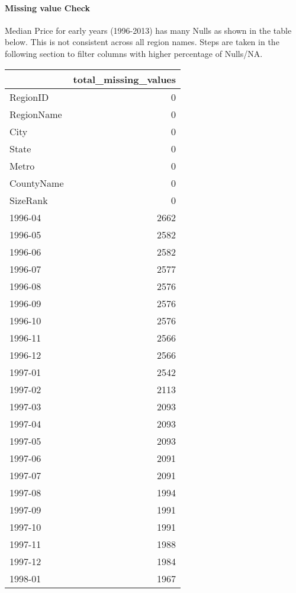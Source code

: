 \documentclass[
]{article}
\begin{document}
\hypertarget{missing-value-check}{%
\paragraph{Missing value Check}\label{missing-value-check}}

Median Price for early years (1996-2013) has many Nulls as shown in the
table below. This is not consistent across all region names. Steps are
taken in the following section to filter columns with higher percentage
of Nulls/NA.

\begin{table}[H]
\centering
\begin{tabular}{l|r}
\hline
  & total\_missing\_values\\
\hline
RegionID & 0\\
\hline
RegionName & 0\\
\hline
City & 0\\
\hline
State & 0\\
\hline
Metro & 0\\
\hline
CountyName & 0\\
\hline
SizeRank & 0\\
\hline
1996-04 & 2662\\
\hline
1996-05 & 2582\\
\hline
1996-06 & 2582\\
\hline
1996-07 & 2577\\
\hline
1996-08 & 2576\\
\hline
1996-09 & 2576\\
\hline
1996-10 & 2576\\
\hline
1996-11 & 2566\\
\hline
1996-12 & 2566\\
\hline
1997-01 & 2542\\
\hline
1997-02 & 2113\\
\hline
1997-03 & 2093\\
\hline
1997-04 & 2093\\
\hline
1997-05 & 2093\\
\hline
1997-06 & 2091\\
\hline
1997-07 & 2091\\
\hline
1997-08 & 1994\\
\hline
1997-09 & 1991\\
\hline
1997-10 & 1991\\
\hline
1997-11 & 1988\\
\hline
1997-12 & 1984\\
\hline
1998-01 & 1967\\

\end{tabular}
\end{table}
\end{document}
